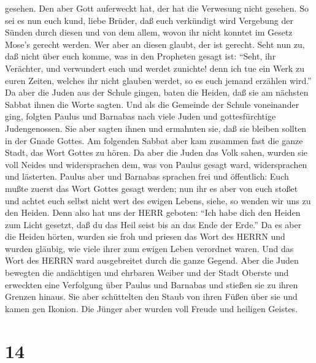 gesehen.  Den aber Gott auferweckt hat, der hat die
Verwesung nicht gesehen.  So sei es nun euch kund, liebe
Brüder, daß euch verkündigt wird Vergebung der Sünden durch diesen und
von dem allem, wovon ihr nicht konntet im Gesetz Mose's gerecht werden.
 Wer aber an diesen glaubt, der ist gerecht. 
Seht nun zu, daß nicht über euch komme, was in den Propheten gesagt ist:
 ``Seht, ihr Verächter, und verwundert euch und werdet
zunichte! denn ich tue ein Werk zu euren Zeiten, welches ihr nicht
glauben werdet, so es euch jemand erzählen wird.''  Da aber
die Juden aus der Schule gingen, baten die Heiden, daß sie am nächsten
Sabbat ihnen die Worte sagten.  Und als die Gemeinde der
Schule voneinander ging, folgten Paulus und Barnabas nach viele Juden
und gottesfürchtige Judengenossen. Sie aber sagten ihnen und ermahnten
sie, daß sie bleiben sollten in der Gnade Gottes.  Am
folgenden Sabbat aber kam zusammen fast die ganze Stadt, das Wort Gottes
zu hören.  Da aber die Juden das Volk sahen, wurden sie
voll Neides und widersprachen dem, was von Paulus gesagt ward,
widersprachen und lästerten.  Paulus aber und Barnabas
sprachen frei und öffentlich: Euch mußte zuerst das Wort Gottes gesagt
werden; nun ihr es aber von euch stoßet und achtet euch selbst nicht
wert des ewigen Lebens, siehe, so wenden wir uns zu den Heiden.
 Denn also hat uns der HERR geboten: ``Ich habe dich den
Heiden zum Licht gesetzt, daß du das Heil seist bis an das Ende der
Erde.''  Da es aber die Heiden hörten, wurden sie froh und
priesen das Wort des HERRN und wurden gläubig, wie viele ihrer zum
ewigen Leben verordnet waren.  Und das Wort des HERRN ward
ausgebreitet durch die ganze Gegend.  Aber die Juden
bewegten die andächtigen und ehrbaren Weiber und der Stadt Oberste und
erweckten eine Verfolgung über Paulus und Barnabas und stießen sie zu
ihren Grenzen hinaus.  Sie aber schüttelten den Staub von
ihren Füßen über sie und kamen gen Ikonion.  Die Jünger
aber wurden voll Freude und heiligen Geistes.

\hypertarget{section-13}{%
\section{14}\label{section-13}}

